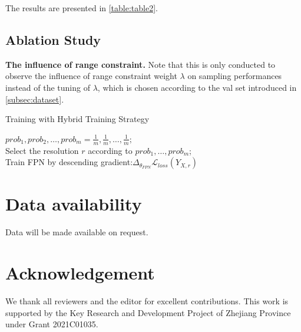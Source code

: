 \documentclass[a4paper,10pt]{article}
\begin{document}
\begin{multicols}{2}
The results are presented in \autoref{table:table2}.

\subsection{Ablation Study}
\textbf{The influence of range constraint.} Note that this is only conducted to observe the inﬂuence of range constraint weight $\lambda$ on sampling performances instead of the tuning of $\lambda$, which is chosen according to the val set introduced in \autoref{subsec:dataset}.

\begin{algorithm}[H]
\label{alg:algo-1}
\SetAlgoCaptionSeparator{}
\caption{Training with Hybrid Training Strategy}
\SetAlgoNoLine
{}
$prob_1, prob_2, \ldots, prob_m = \frac{1}{m}, \frac{1}{m}, \ldots, \frac{1}{m};$\\
{
Select the resolution $r$ according to $prob_1,\ldots, prob_m$;\\Train FPN by descending gradient:$\Delta_{\theta_{FPN}}\mathcal{L}_{loss}\left(Y_{X, r}\right)$\\
}
\end{algorithm}

\section*{Data availability}
Data will be made available on request.

\section*{Acknowledgement}
We thank all reviewers and the editor for excellent contributions. This work is supported by the Key Research and Development Project of Zhejiang Province under Grant 2021C01035.

\printbibliography

\end{multicols}
\end{document}
